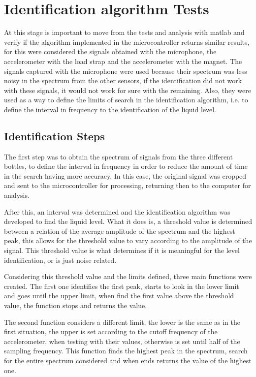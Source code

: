 \section{Identification algorithm Tests}
At this stage is important to move from the tests and analysis with \acrshort{matlab} and verify if the algorithm implemented in the microcontroller returns similar results, for this were considered the signals obtained with the microphone, the accelerometer with the load strap and the accelerometer with the magnet. The signals captured with the microphone were used because their spectrum was less noisy in the spectrum from the other sensors, if the identification did not work with these signals, it would not work for sure with the remaining. Also, they were used as a way to define the limits of search in the identification algorithm, i.e. to define the interval in frequency to the identification of the liquid level.  
\subsection{Identification Steps}
The first step was to obtain the spectrum of signals from the three different bottles, to define the interval in frequency in order to reduce the amount of time in the search having more accuracy. In this case, the original signal was cropped and sent to the microcontroller for processing, returning then to the computer for analysis.

After this, an interval was determined and the identification algorithm was developed to find the liquid level. What it does is, a threshold value is determined between a relation of the average amplitude of the spectrum and the highest peak, this allows for the threshold value to vary according to the amplitude of the signal. This threshold value is what determines if it is meaningful for the level identification, or is just noise related. 

Considering this threshold value and the limits defined, three main functions were created. The first one identifies the first peak, starts to look in the lower limit and goes until the upper limit, when find the first value above the threshold value, the function stops and returns the value.

The second function considers a different limit, the lower is the same as in the first situation, the upper is set according to the cutoff frequency of the accelerometer, when testing with their values, otherwise is set until half of the sampling frequency. This function finds the highest peak in the spectrum, search for the entire spectrum considered and when ends returns the value of the highest one.

